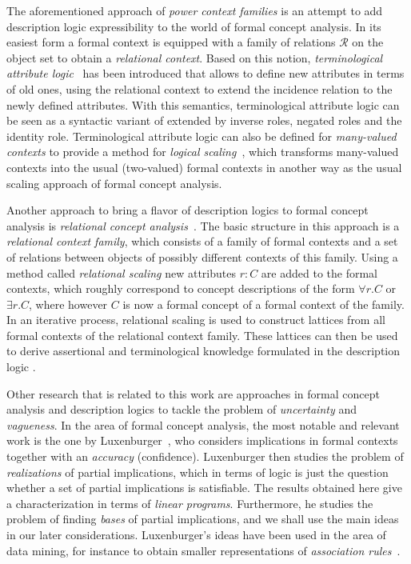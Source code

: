 The aforementioned approach of \emph{power context families} is an attempt to add
description logic expressibility to the world of formal concept analysis.  In its easiest
form a formal context is equipped with a family of relations $\mathcal{R}$ on the object
set to obtain a \emph{relational context}.  Based on this notion, \emph{terminological
  attribute logic}~\cite{books/math/Prediger00} has been introduced that allows to define
new attributes in terms of old ones, using the relational context to extend the incidence
relation to the newly defined attributes.  With this semantics, terminological attribute
logic can be seen as a syntactic variant of \ALC extended by inverse roles, negated roles
and the identity role.  Terminological attribute logic can also be defined for
\emph{many-valued contexts} to provide a method for \emph{logical
  scaling}~\cite{conf/krdb/PredigerS99}, which transforms many-valued contexts into the
usual (two-valued) formal contexts in another way as the usual scaling approach of formal
concept analysis.

Another approach to bring a flavor of description logics to formal concept analysis is
\emph{relational concept analysis}~\cite{conf/icfca/RouaneHNV07,
  journals/amai/HaceneHNV13}.  The basic structure in this approach is a \emph{relational
  context family}, which consists of a family of formal contexts and a set of relations
between objects of possibly different contexts of this family.  Using a method called
\emph{relational scaling} new attributes $r : C$ are added to the formal contexts, which
roughly correspond to concept descriptions of the form $\forall r. C$ or $\exists r. C$,
where however $C$ is now a formal concept of a formal context of the family.  In an
iterative process, relational scaling is used to construct lattices from all formal
contexts of the relational context family.  These lattices can then be used to derive
assertional and terminological knowledge formulated in the description logic \FLE.

Other research that is related to this work are approaches in formal concept analysis and
description logics to tackle the problem of \emph{uncertainty} and \emph{vagueness}.  In
the area of formal concept analysis, the most notable and relevant work is the one by
Luxenburger~\cite{diss:Luxenburger,Luxenburger91}, who considers implications in formal
contexts together with an \emph{accuracy} (confidence).  Luxenburger then studies the
problem of \emph{realizations} of partial implications, which in terms of logic is just
the question whether a set of partial implications is satisfiable.  The results obtained
here give a characterization in terms of \emph{linear programs}.  Furthermore, he studies
the problem of finding \emph{bases} of partial implications, and we shall use the main
ideas in our later considerations.  Luxenburger's ideas have been used in the area of data
mining, for instance to obtain smaller representations of \emph{association
  rules}~\cite{DBLP:conf/ki/StummeTBPL01}.

